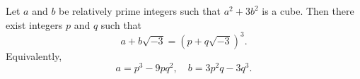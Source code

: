 Let $a$ and $b$ be relatively prime integers such that $a^2 + 3b^2$ is a cube. Then there exist integers $p$ and $q$ such that
$$a + b\sqrt{-3} = (p + q\sqrt{-3})^3.$$
Equivalently,
$$a = p^3 - 9pq^2, \quad b = 3p^2q - 3q^3.$$
